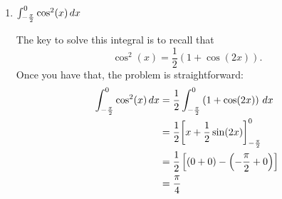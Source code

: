 \documentclass[handout,nooutcomes]{ximera}
\begin{document}
\begin{problem}
\begin{enumerate}
	\item  $\int_{- \frac{\pi}{2}}^0 \cos^2 (x) \,d x$
		\begin{freeResponse}
		The key to solve this integral is to recall that
		$$ \cos^2 (x) = \frac{1}{2} \left( 1 + \cos(2x) \right) .$$
		Once you have that, the problem is straightforward:
			\begin{align*}
			\int_{- \frac{\pi}{2}}^0 \cos^2 (x) \,d x &= \frac{1}{2} \int_{- \frac{\pi}{2}}^0 \left( 1 + \cos(2x) \right) \,d x  \\
			&= \frac{1}{2} \bigg[  x + \frac{1}{2} \sin(2x)   \bigg]_{- \frac{\pi}{2}}^0  \\
			&= \frac{1}{2} \left[ (0 + 0) - \left(- \frac{\pi}{2} + 0 \right) \right]  \\
			&= \frac{\pi}{4}
			\end{align*}
		\end{freeResponse}
		
		
		
	\end{enumerate}
		
		
\end{problem}
















\begin{problem}

		\begin{freeResponse}
		
		\end{freeResponse}
		
		
		

\end{problem}
	
	
	
	
	
	
	
	
			
			

\begin{problem}

		\begin{freeResponse}
			
		\end{freeResponse}
			
			
		
\end{problem}
\end{document}

